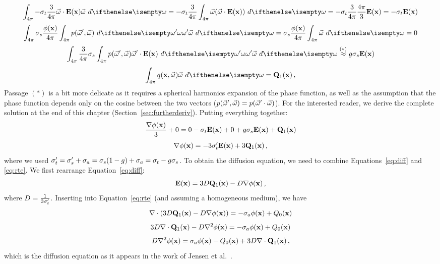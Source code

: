\documentclass[10pt,a4paper]{article}
\begin{document}
$$
\sphere{-\extinction\frac{3}{4\pi} \omegavec \cdot \xvecfunc{E} \omegavec}{} = -\extinction \frac{3}{4\pi} \sphere{ \omegavec (\omegavec \cdot \xvecfunc{E})}{} = -\extinction\frac{3}{4\pi} \frac{4\pi}{3} \xvecfunc{E} = -\extinction \xvecfunc{E}
$$
$$
\sphere{\scattering \frac{\xfunc{\phi}}{4\pi} \sphere {p(\omegavec', \omegavec)}{\omega'} \omegavec}{} = \scattering \frac{\xfunc{\phi}}{4\pi} \sphere{\omegavec}{} = 0
$$
$$
\sphere{ \frac{3}{4\pi} \scattering  \sphere {p(\omegavec', \omegavec)  \omegavec' \cdot \xvecfunc{E}}{\omega'} \omegavec}{} \stackrel{(*)}{\approx} g \scattering  \xvecfunc{E}
$$
$$
\sphere{ \xomegafunc{q} \omegavec}{} =  \sourceonex \, ,
$$
Passage $(*)$ is a bit more delicate as it requires a spherical harmonics expansion of the phase function, as well as the assumption that the phase function depends only on the cosine between the two vectors ($p(\vec{\omega}', \vec{\omega}) = p(\vec{\omega}' \cdot \vec{\omega})$). For the interested reader, we derive the complete solution at the end of this chapter (Section~\ref{sec:furtherderiv}). Putting everything together:
$$
\frac{{\nabla} {\phi}(\mathbf{x})}{3} + 0 = 0 -\sigma_t \mathbf{E}(\mathbf{x}) + 0 + g \sigma_s  \mathbf{E}(\mathbf{x}) + \mathbf{Q}_1(\mathbf{x})
$$
\begin{equation}
{\nabla} {\phi}(\mathbf{x}) = -3\sigma_t' \mathbf{E}(\mathbf{x}) + 3\mathbf{Q}_1(\mathbf{x}) \, ,
\label{eq:diff}
\end{equation}
where we used $\sigma_t' = \sigma_s' + \sigma_a = \sigma_s (1-g) + \sigma_a = \sigma_t -g \sigma_s$.
To obtain the diffusion equation, we need to combine Equations~\ref{eq:diff} and \ref{eq:rte}. We first rearrange Equation~\ref{eq:diff}:
$$
\mathbf{E}(\mathbf{x}) = 3 D \mathbf{Q}_1(\mathbf{x})  - D {\nabla} {\phi}(\mathbf{x}) \, ,
$$
where $D = \frac{1}{3 \sigma_t'}$. Inserting into Equation~\ref{eq:rte} (and assuming a homogeneous medium), we have
$$
{\nabla} \cdot (3 D \mathbf{Q}_1(\mathbf{x})  - D {\nabla} {\phi}(\mathbf{x})) = -\sigma_a  {\phi}(\mathbf{x}) + {Q_0}(\mathbf{x})
$$
$$
3 D {\nabla} \cdot \mathbf{Q}_1(\mathbf{x}) - D \nabla^2 {\phi}(\mathbf{x}) =  -\sigma_a  {\phi}(\mathbf{x}) + {Q_0}(\mathbf{x})
$$
\begin{equation} \label{eq:diffusion}
D \nabla^2 {\phi}(\mathbf{x}) = \sigma_a {\phi}(\mathbf{x}) - {Q_0}(\mathbf{x}) + 3 D {\nabla} \cdot \mathbf{Q}_1(\mathbf{x}) \, ,
\end{equation}
which is the diffusion equation as it appears in the work of Jensen et al.~\cite{jensen01}.
\end{document}
